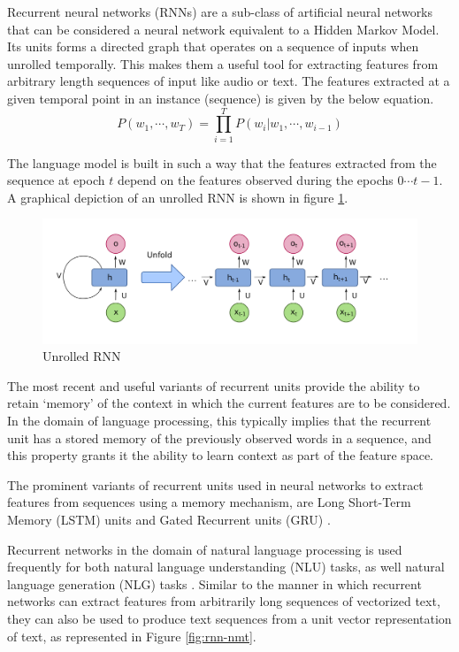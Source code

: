 Recurrent neural networks (RNNs) are a sub-class of artificial neural networks that can be considered a neural network equivalent to a Hidden Markov Model. Its units forms a directed graph that operates on a sequence of inputs when unrolled temporally. This makes them a useful tool for extracting features from arbitrary length sequences of input like audio or text. The features extracted at a given temporal point in an instance (sequence) is given by the below equation.
\begin{equation}
	P(w_1, \cdots, w_T) = \prod_{i=1}^T P(w_i | w_1, \cdots, w_{i−1})
\end{equation}

The language model is built in such a way that the features extracted from the sequence at epoch $t$ depend on the features observed during the epochs $0 \cdots t-1$. A graphical depiction of an unrolled RNN is shown in figure \ref{fig:recurrent-neural-network-unfold}.

\begin{figure}[ht]
	\centering
	\includegraphics[width=\textwidth]{images/recurrent-neural-network-unfold}
	\caption{\label{fig:recurrent-neural-network-unfold} Unrolled RNN}
\end{figure}

The most recent and useful variants of recurrent units provide the ability to retain `memory' of the context in which the current features are to be considered. In the domain of language processing, this typically implies that the recurrent unit has a stored memory of the previously observed words in a sequence, and this property grants it the ability to learn context as part of the feature space.

The prominent variants of recurrent units used in neural networks to extract features from sequences using a memory mechanism, are Long Short-Term Memory (LSTM) units \citep{gers2001lstm} and Gated Recurrent units (GRU) \citep{chung2014empirical}.

Recurrent networks in the domain of natural language processing is used frequently for both natural language understanding (NLU) tasks, as well natural language generation (NLG) tasks \citep{mikolov2010recurrent}. Similar to the manner in which recurrent networks can extract features from arbitrarily long sequences of vectorized text, they can also be used to produce text sequences from a unit vector representation of text, as represented in Figure \ref{fig:rnn-nmt}.

